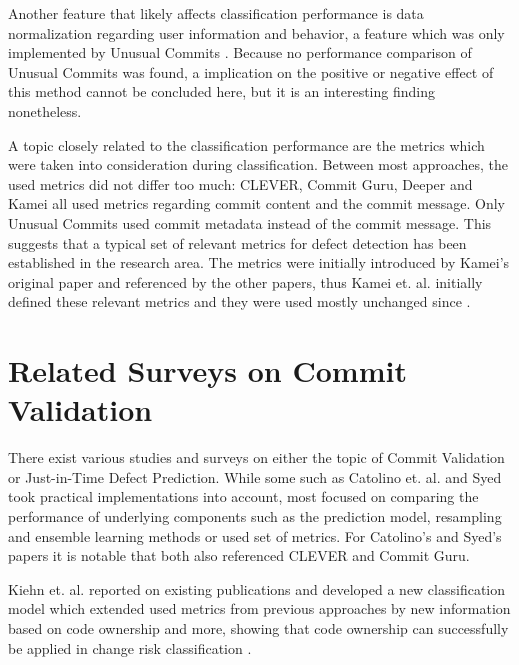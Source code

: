 Another feature that likely affects classification performance is data normalization regarding user information and behavior, a feature which was only implemented by Unusual Commits \cite{Goyal2017}.
Because no performance comparison of Unusual Commits was found, a implication on the positive or negative effect of this method cannot be concluded here, but it is an interesting finding nonetheless.

A topic closely related to the classification performance are the metrics which were taken into consideration during classification. Between most approaches, the used metrics did not differ too much: CLEVER, Commit Guru, Deeper and Kamei all used metrics regarding commit content and the commit message. Only Unusual Commits used commit metadata instead of the commit message. This suggests that a typical set of relevant metrics for defect detection has been established in the research area. The metrics were initially introduced by Kamei's original paper and referenced by the other papers, thus Kamei et. al. initially defined these relevant metrics and they were used mostly unchanged since \cite{Kamei2013}.




\section{Related Surveys on Commit Validation}
\label{sec:relatedsurveys}

There exist various studies and surveys on either the topic of Commit Validation or Just-in-Time Defect Prediction. While some such as Catolino et. al. \cite{Catolino2019} and Syed \cite{Syed2019} took practical implementations into account, most focused on comparing the performance of underlying components such as the prediction model, resampling and ensemble learning methods or used set of metrics. For Catolino's and Syed's papers it is notable that both also referenced CLEVER and Commit Guru.

Kiehn et. al. reported on existing publications and developed a new classification model which extended used metrics from previous approaches by new information based on code ownership and more, showing that code ownership can successfully be applied in change risk classification \cite{Kiehn2019}.

